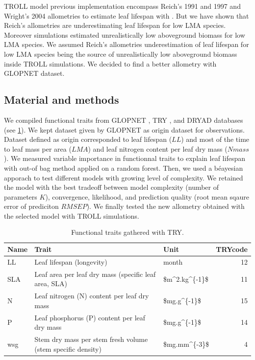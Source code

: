 \documentclass[12pt,]{article}
\theoremstyle{definition}
\theoremstyle{definition}
\theoremstyle{remark}
\begin{document}
TROLL model previous implementation encompass Reich's 1991 and 1997 and
Wright's 2004 allometries to estimate leaf lifespan with
\citep{Reich1991a, Reich1997, wright_worldwide_2004}. But we have shown
that Reich's allometries are underestimating leaf lifespan for low LMA
species. Moreover simulations estimated unrealistically low aboveground
biomass for low LMA species. We assumed Reich's allometries
underestimation of leaf lifespan for low LMA species being the source of
unrealistically low aboveground biomass inside TROLL simulations. We
decided to find a better allometry with \citet{wright_worldwide_2004}
GLOPNET dataset.

\subsection{Material and methods}\label{material-and-methods-1}

We compiled functional traits from GLOPNET
\citep{wright_worldwide_2004}, TRY \citep{Kattge2011}, and DRYAD
\citep{chave_towards_2009} databases (see \ref{tab:A2traits}). We kept
dataset given by GLOPNET as origin dataset for observations. Dataset
defined as origin corresponded to leaf lifespan (\(LL\)) and most of the
time to leaf mass per area (\(LMA\)) and leaf nitrogen content per leaf
dry mass (\(Nmass\)). We measured variable importance in functionnal
traits to explain leaf lifespan with out-of bag method applied on a
random forest. Then, we used a béayesian apporach to test different
models with growing level of complexity. We retained the model with the
best tradeoff between model complexity (number of parameters \(K\)),
convergence, likelihood, and prediction quality (root mean sqaure error
of prediciton \(RMSEP\)). We finally tested the new allometry obtained
with the selected model with TROLL simulations.

\begin{table}

\caption{\label{tab:A2traits}Functional traits gathered with TRY.}
\centering
\begin{tabular}[t]{l|l|l|r}
\hline
Name & Trait & Unit & TRYcode\\
\hline
LL & Leaf lifespan (longevity) & month & 12\\
\hline
SLA & Leaf area per leaf dry mass (specific leaf area, SLA) & \$m\textasciicircum{}2.kg\textasciicircum{}\{-1\}\$ & 11\\
\hline
N & Leaf nitrogen (N) content per leaf dry mass & \$mg.g\textasciicircum{}\{-1\}\$ & 15\\
\hline
P & Leaf phosphorus (P) content per leaf dry mass & \$mg.g\textasciicircum{}\{-1\}\$ & 14\\
\hline
wsg & Stem dry mass per stem fresh volume (stem specific density) & \$mg.mm\textasciicircum{}\{-3\}\$ & 4\\
\hline
\end{tabular}
\end{table}
\end{document}
